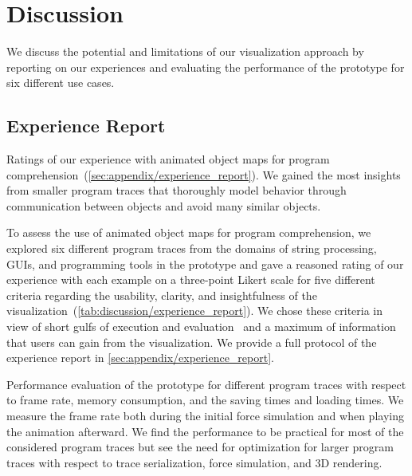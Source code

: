 \section{Discussion}
\label{sec:discussion}

We discuss the potential and limitations of our visualization approach by reporting on our experiences and evaluating the performance of the \tfd{} prototype for six different use cases.

\subsection{Experience Report}
\label{sec:discussion/experience_report}

\begin{table}[b!]
	\centering
	\caption{
		Ratings of our experience with animated object maps for program comprehension~(\cref{sec:appendix/experience_report}).
		We gained the most insights from smaller program traces that thoroughly model behavior through communication between objects and avoid many similar objects.
	}
	\label{tab:discussion/experience_report}
	\begin{threeparttable}
		\centering
		{\footnotesize
		}
	\end{threeparttable}
\end{table}

To assess the use of animated object maps for program comprehension, we explored six different program traces from the domains of string processing, GUIs, and programming tools in the \tfd{} prototype and gave a reasoned rating of our experience with each example on a three-point Likert scale for five different criteria regarding the usability, clarity, and insightfulness of the visualization~(\cref{tab:discussion/experience_report}).
We chose these criteria in view of short gulfs of execution and evaluation~\cite{norman1986cognitive} and a maximum of information that users can gain from the visualization.
We provide a full protocol of the experience report in \cref{sec:appendix/experience_report}.

\begin{table*}[bp]
	\centering
	\caption{
		Performance evaluation of the \tfd{} prototype for different program traces with respect to frame rate, memory consumption, and the saving times and loading times.
		We measure the frame rate both during the initial force simulation and when playing the animation afterward.
		We find the performance to be practical for most of the considered program traces but see the need for optimization for larger program traces with respect to trace serialization, force simulation, and 3D rendering.
	}
	\label{tab:discussion/performance}
	\begin{threeparttable}
		\centering
		{\footnotesize
		}
	\end{threeparttable}
\end{table*}

